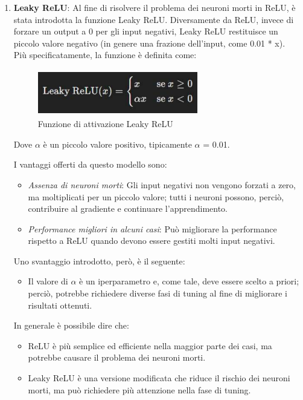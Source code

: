 \documentclass[12pt,a4paper,openright,twoside]{book}
\begin{document}
\begin{enumerate}
\item \textbf{Leaky ReLU}:
Al fine di risolvere il problema dei neuroni morti in ReLU, è stata introdotta la funzione Leaky ReLU.  Diversamente da ReLU, invece di forzare un output a 0 per gli input negativi, Leaky ReLU restituisce un piccolo valore negativo (in genere una frazione dell'input, come 0.01 * x).\\
Più specificatamente, la funzione è definita come:

\begin{figure}[H]
  	\centering
    	\includegraphics[height=2cm, width= 7cm]{figures/leaky.pdf}
    	\caption{Funzione di attivazione Leaky ReLU}
	\label{fig:leaky}
\end{figure} 
Dove $\alpha$ è un piccolo valore positivo, tipicamente $\alpha$ = 0.01.

I vantaggi offerti da questo modello sono:
\begin{itemize}
\item {\itshape Assenza di neuroni morti}: Gli input negativi non vengono forzati a zero, ma moltiplicati per un piccolo valore; tutti i neuroni possono, perciò, contribuire al gradiente e continuare l'apprendimento.
\item {\itshape Performance migliori in alcuni casi}: Può migliorare la performance rispetto a ReLU quando devono essere gestiti molti input negativi.
\end{itemize}

Uno svantaggio introdotto, però, è il seguente:
\begin{itemize}
\item Il valore di $\alpha$ è un iperparametro e, come tale, deve essere scelto a priori; perciò, potrebbe richiedere diverse fasi di tuning al fine di migliorare i risultati ottenuti.
\end{itemize}

In generale è possibile dire che:
\begin{itemize}
\item ReLU è più semplice ed efficiente nella maggior parte dei casi, ma potrebbe causare il  problema dei neuroni morti.
\item Leaky ReLU è una versione modificata che riduce il rischio dei neuroni morti, ma può richiedere più attenzione nella fase di tuning.
\end{itemize}
\end{enumerate}
\end{document}
